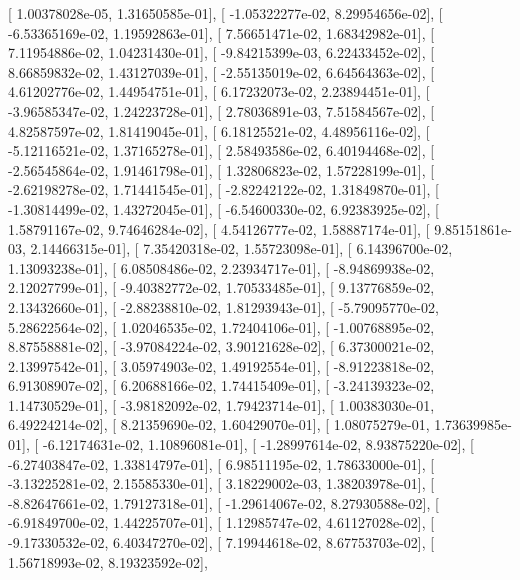 \documentclass{article}
\begin{document}
       [  1.00378028e-05,   1.31650585e-01],
       [ -1.05322277e-02,   8.29954656e-02],
       [ -6.53365169e-02,   1.19592863e-01],
       [  7.56651471e-02,   1.68342982e-01],
       [  7.11954886e-02,   1.04231430e-01],
       [ -9.84215399e-03,   6.22433452e-02],
       [  8.66859832e-02,   1.43127039e-01],
       [ -2.55135019e-02,   6.64564363e-02],
       [  4.61202776e-02,   1.44954751e-01],
       [  6.17232073e-02,   2.23894451e-01],
       [ -3.96585347e-02,   1.24223728e-01],
       [  2.78036891e-03,   7.51584567e-02],
       [  4.82587597e-02,   1.81419045e-01],
       [  6.18125521e-02,   4.48956116e-02],
       [ -5.12116521e-02,   1.37165278e-01],
       [  2.58493586e-02,   6.40194468e-02],
       [ -2.56545864e-02,   1.91461798e-01],
       [  1.32806823e-02,   1.57228199e-01],
       [ -2.62198278e-02,   1.71441545e-01],
       [ -2.82242122e-02,   1.31849870e-01],
       [ -1.30814499e-02,   1.43272045e-01],
       [ -6.54600330e-02,   6.92383925e-02],
       [  1.58791167e-02,   9.74646284e-02],
       [  4.54126777e-02,   1.58887174e-01],
       [  9.85151861e-03,   2.14466315e-01],
       [  7.35420318e-02,   1.55723098e-01],
       [  6.14396700e-02,   1.13093238e-01],
       [  6.08508486e-02,   2.23934717e-01],
       [ -8.94869938e-02,   2.12027799e-01],
       [ -9.40382772e-02,   1.70533485e-01],
       [  9.13776859e-02,   2.13432660e-01],
       [ -2.88238810e-02,   1.81293943e-01],
       [ -5.79095770e-02,   5.28622564e-02],
       [  1.02046535e-02,   1.72404106e-01],
       [ -1.00768895e-02,   8.87558881e-02],
       [ -3.97084224e-02,   3.90121628e-02],
       [  6.37300021e-02,   2.13997542e-01],
       [  3.05974903e-02,   1.49192554e-01],
       [ -8.91223818e-02,   6.91308907e-02],
       [  6.20688166e-02,   1.74415409e-01],
       [ -3.24139323e-02,   1.14730529e-01],
       [ -3.98182092e-02,   1.79423714e-01],
       [  1.00383030e-01,   6.49224214e-02],
       [  8.21359690e-02,   1.60429070e-01],
       [  1.08075279e-01,   1.73639985e-01],
       [ -6.12174631e-02,   1.10896081e-01],
       [ -1.28997614e-02,   8.93875220e-02],
       [ -6.27403847e-02,   1.33814797e-01],
       [  6.98511195e-02,   1.78633000e-01],
       [ -3.13225281e-02,   2.15585330e-01],
       [  3.18229002e-03,   1.38203978e-01],
       [ -8.82647661e-02,   1.79127318e-01],
       [ -1.29614067e-02,   8.27930588e-02],
       [ -6.91849700e-02,   1.44225707e-01],
       [  1.12985747e-02,   4.61127028e-02],
       [ -9.17330532e-02,   6.40347270e-02],
       [  7.19944618e-02,   8.67753703e-02],
       [  1.56718993e-02,   8.19323592e-02],
\end{document}
